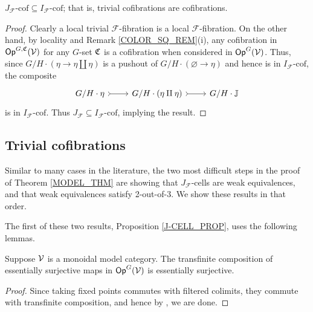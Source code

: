 \documentclass[a4paper,10pt
,draft
]{article}%
\renewcommand{\F}{\mathcal F}
\newcommand{\J}{\mathbb J}
\renewcommand{\1}{\eta}%
\begin{document}
\begin{lemma}
      [{cf. \cite[1.19]{CM13b}}]
      \label{POINT_4_LEMMA}
      $J_{\F}\mbox{-cof} \subseteq I_{\F}\mbox{-cof}$; that is, trivial cofibrations are cofibrations.
\end{lemma}
\begin{proof}
      Clearly a local trivial $\F$-fibration is a local $\F$-fibration.
      On the other hand, by locality and Remark \ref{COLOR_SQ_REM}(i),
      any cofibration in $\mathsf{Op}^{G, \mathfrak C}(\mathcal V)$ for any $G$-set $\mathfrak C$
      is a cofibration when considered in $\mathsf{Op}^G(\mathcal V)$.
      Thus, since $G/H \cdot (\1 \to \1 \amalg \1)$ is a pushout of $G/H \cdot(\varnothing \to \1)$
      and hence is in $I_{\F}\mbox{-cof}$, the composite
      \begin{equation}
            \begin{tikzcd}
                  G/H \cdot \1 \arrow[r, rightarrowtail]
                  &
                  G/H \cdot (\1 \amalg \1) \arrow[r, rightarrowtail]
                  &
                  G/H \cdot \J 
            \end{tikzcd}
      \end{equation}
      is in $I_{\F}\mbox{-cof}$.
      Thus $J_\F \subseteq I_\F\mbox{-cof}$, implying the result.
\end{proof}

\subsection{Trivial cofibrations}

Similar to many cases in the literature, the two most difficult steps in the proof of Theorem \ref{MODEL_THM} are showing that
$J_\F$-cells are weak equivalences, and that weak equivalences satisfy 2-out-of-3.
We show these results in that order.

The first of these two results, Proposition \ref{J-CELL_PROP}, uses the following lemmas.

\begin{lemma}
      \label{TRANSCOMP_ES_LEM}
      Suppose $\mathcal V$ is a monoidal model category.
      The transfinite composition of essentially surjective maps in $\mathsf{Op}^G(\mathcal V)$ is essentially surjective.
\end{lemma}
\begin{proof}
      Since taking fixed points commutes with filtered colimits, they commute with transfinite composition,
      and hence by \cite[4.17]{Cav}, we are done.
\end{proof}
\end{document}
